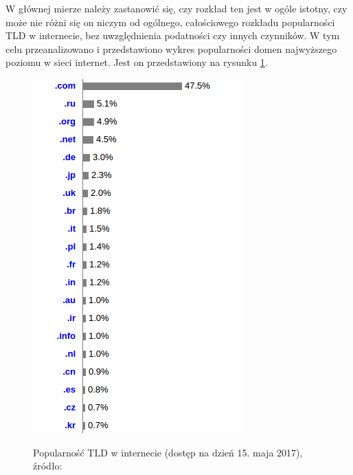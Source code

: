 W głównej mierze należy zastanowić się, czy rozkład ten jest w ogóle istotny, czy może nie różni się on niczym od ogólnego, całościowego rozkładu popularności TLD w internecie, bez uwzględnienia podatności czy innych czynników. W tym celu przeanalizowano i przedstawiono wykres popularności domen najwyższego poziomu w sieci internet. Jest on przedstawiony na rysunku \ref{TLD_all}.
\begin{center}
	\begin{figure}
		\includegraphics[scale=0.75]{image/TLD_all}\label{TLD_all}
		\caption{Popularność TLD w internecie (dostęp na dzień 15. maja 2017), źródło:  \cite{TLD_popularity}}
	\end{figure}
\end{center}  

